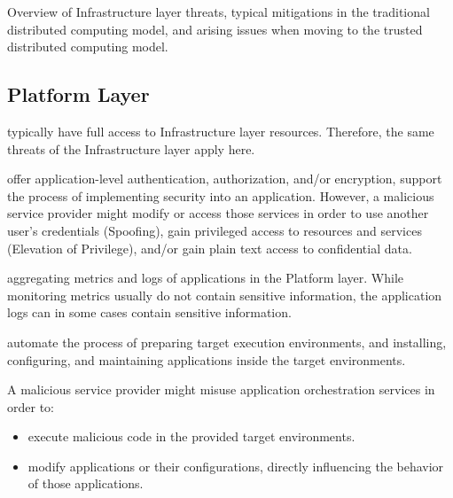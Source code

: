\begin{table}[H]
  \centering
  \scriptsize
  
  \caption{Overview of Infrastructure layer threats, typical mitigations in the traditional distributed computing model, and arising issues when moving to the trusted distributed computing model.}
  \label{table:threats-overview}
\end{table}

\subsection{Platform Layer}

\begin{description}[style=standard]
  \item[Infrastructure management services] typically have full access to
    Infrastructure layer resources. Therefore, the same threats of the
    Infrastructure layer apply here.

  \item[Security services] offer application-level authentication,
    authorization, and/or encryption, support the process of implementing
    security into an application. However, a malicious service provider might
    modify or access those services in order to use another user's credentials
    (Spoofing), gain privileged access to resources and services (Elevation of
    Privilege), and/or gain plain text access to confidential data.

  \item[Monitoring and Logging services] aggregating metrics and logs of
    applications in the Platform layer. While monitoring metrics usually do not
    contain sensitive information, the application logs can in some cases
    contain sensitive information.

  \item[Application orchestration services] automate the process of preparing
    target execution environments, and installing, configuring, and maintaining
    applications inside the target environments.
    
    A malicious service provider might misuse application orchestration services
    in order to:

    \begin{itemize}
      \item execute malicious code in the provided target environments.
      \item modify applications or their configurations, directly influencing
            the behavior of those applications.
    \end{itemize}
\end{description}

